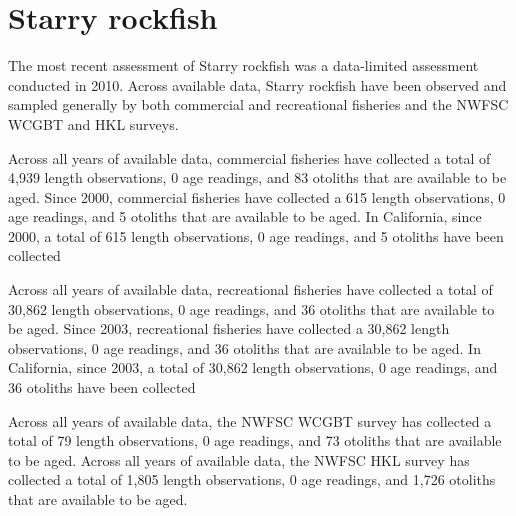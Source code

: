 \documentclass[11pt,
  english,
  letterpaper,
]{article}
\begin{document}

\hypertarget{starry-rockfish}{%
\section{Starry rockfish}\label{starry-rockfish}}

\leavevmode\tagmcend\tagstructend


The most recent assessment of Starry rockfish was a data-limited assessment conducted in 2010. Across available data, Starry rockfish have been observed and sampled generally by both commercial and recreational fisheries and the NWFSC WCGBT and HKL surveys.

\leavevmode\tagmcend\tagstructend\par


Across all years of available data, commercial fisheries have collected a total of 4,939 length observations, 0 age readings, and 83 otoliths that are available to be aged. Since 2000, commercial fisheries have collected a 615 length observations, 0 age readings, and 5 otoliths that are available to be aged. In California, since 2000, a total of 615 length observations, 0 age readings, and 5 otoliths have been collected

\leavevmode\tagmcend\tagstructend\par


Across all years of available data, recreational fisheries have collected a total of 30,862 length observations, 0 age readings, and 36 otoliths that are available to be aged. Since 2003, recreational fisheries have collected a 30,862 length observations, 0 age readings, and 36 otoliths that are available to be aged. In California, since 2003, a total of 30,862 length observations, 0 age readings, and 36 otoliths have been collected

\leavevmode\tagmcend\tagstructend\par


Across all years of available data, the NWFSC WCGBT survey has collected a total of 79 length observations, 0 age readings, and 73 otoliths that are available to be aged. Across all years of available data, the NWFSC HKL survey has collected a total of 1,805 length observations, 0 age readings, and 1,726 otoliths that are available to be aged.
\end{document}
